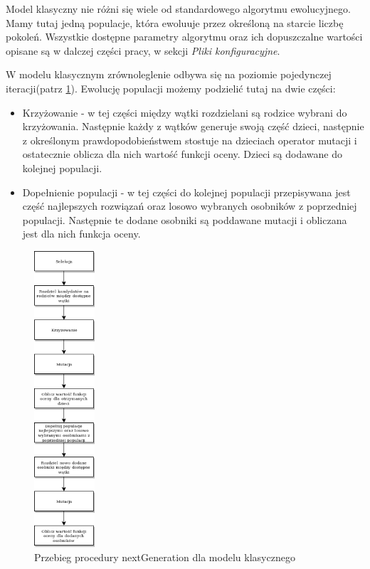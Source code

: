 Model klasyczny nie różni się wiele od standardowego algorytmu ewolucyjnego. Mamy tutaj jedną populacje, która ewoluuje przez 
określoną na starcie liczbę pokoleń. Wszystkie dostępne parametry algorytmu oraz ich dopuszczalne wartości opisane są w dalczej części pracy, 
w sekcji \textit{Pliki konfiguracyjne}.

W modelu klasycznym zrównoleglenie odbywa się na poziomie pojedynczej iteracji(patrz \ref{next_gen_klasyczny_img}). 
Ewolucję populacji możemy podzielić tutaj na dwie części:
\begin{itemize}
    \item Krzyżowanie - w tej części między wątki rozdzielani są rodzice wybrani do krzyżowania. Następnie każdy z wątków generuje swoją część 
    dzieci, następnie z określonym prawdopodobieństwem stostuje na dzieciach operator mutacji i ostatecznie oblicza dla nich wartość funkcji oceny. 
    Dzieci są dodawane do kolejnej populacji.
    \item Dopełnienie populacji - w tej części do kolejnej populacji przepisywana jest część najlepszych rozwiązań oraz losowo wybranych osobników 
    z poprzedniej populacji. Następnie te dodane osobniki są poddawane mutacji i obliczana jest dla nich funkcja oceny.
\end{itemize}

\begin{figure}[H]
    \centering        
    \includegraphics[width=0.2\textwidth]{img/next_gen_klasyczny.png}
    \caption{Przebieg procedury nextGeneration dla modelu klasycznego}
    \label{next_gen_klasyczny_img}
\end{figure}

